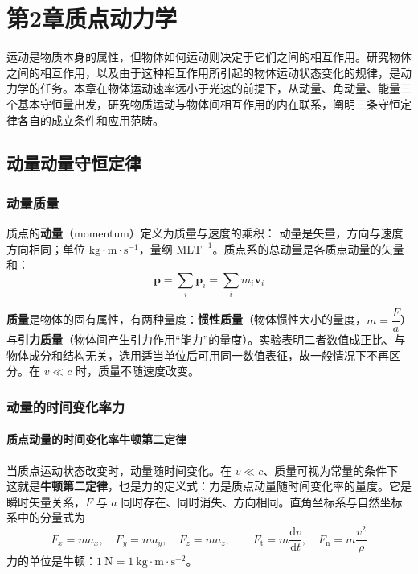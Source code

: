 \chapter{第2章\texorpdfstring{\hspace{0.5em}}{ }质点动力学}

运动是物质本身的属性，但物体如何运动则决定于它们之间的相互作用。研究物体之间的相互作用，以及由于这种相互作用所引起的物体运动状态变化的规律，是动力学的任务。本章在物体运动速率远小于光速的前提下，从动量、角动量、能量三个基本守恒量出发，研究物质运动与物体间相互作用的内在联系，阐明三条守恒定律各自的成立条件和应用范畴。

\section{动量\texorpdfstring{\hspace{0.5em}}{ }动量守恒定律}
    \subsection{动量\texorpdfstring{\hspace{0.5em}}{ }质量}
    质点的\textbf{动量}（momentum）定义为质量与速度的乘积：
        动量是矢量，方向与速度方向相同；单位 $\mathrm{kg\cdot m\cdot s^{-1}}$，量纲 $\mathrm{MLT^{-1}}$。质点系的总动量是各质点动量的矢量和：
    \[
    \boldsymbol{p}=\sum_{i}\boldsymbol{p}_{i}=\sum_{i}m_{i}\boldsymbol{v}_{i}
    \]

    \textbf{质量}是物体的固有属性，有两种量度：\textbf{惯性质量}（物体惯性大小的量度，$m=\dfrac{F}{a}$）与\textbf{引力质量}（物体间产生引力作用“能力”的量度）。实验表明二者数值成正比、与物体成分和结构无关，选用适当单位后可用同一数值表征，故一般情况下不再区分。在 $v\ll c$ 时，质量不随速度改变。

    \subsection{动量的时间变化率\texorpdfstring{\hspace{0.5em}}{ }力}
        \subsubsection{质点动量的时间变化率\texorpdfstring{\hspace{0.5em}}{ }牛顿第二定律}
        当质点运动状态改变时，动量随时间变化。在 $v\ll c$、质量可视为常量的条件下
        这就是\textbf{牛顿第二定律}，也是力的定义式：力是质点动量随时间变化率的量度。它是瞬时矢量关系，$F$ 与 $a$ 同时存在、同时消失、方向相同。直角坐标系与自然坐标系中的分量式为
        \[
        F_{x}=ma_{x},\quad F_{y}=ma_{y},\quad F_{z}=ma_{z};
        \qquad F_{\mathrm{t}}=m\frac{\mathrm{d}v}{\mathrm{d}t},\quad F_{\mathrm{n}}=m\frac{v^{2}}{\rho}
        \]
        力的单位是牛顿：$1\ \mathrm{N}=1\ \mathrm{kg\cdot m\cdot s^{-2}}$。


